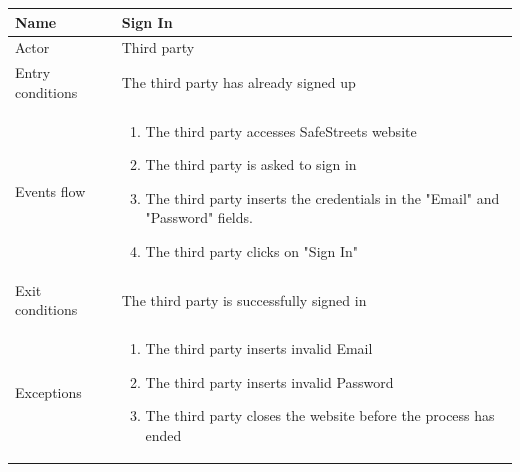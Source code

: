 \documentclass{article}
\begin{document}
\begin{table}[H]
    \begin{tabular}{|l|l|}
    \hline
    Name & \begin{minipage}[t]{0.7\textwidth}\textbf{Sign In} \end{minipage} \\ \hline  
    Actor & \begin{minipage}[t]{0.7\textwidth} Third party \end{minipage} \\ \hline 
    Entry conditions & \begin{minipage}[t]{0.7\textwidth} The third party has already signed up\end{minipage} \\
    \hline 
    Events flow & \begin{minipage}[t]{0.7\textwidth}
    \begin{enumerate}
        \item The third party accesses SafeStreets website
        \item The third party is asked to sign in
        \item The third party inserts the credentials in the "Email" and
        "Password" fields.
        \item The third party clicks on "Sign In"
    \end{enumerate}    
    \end{minipage} \\ \hline
    Exit conditions & \begin{minipage}[t]{0.7\textwidth} The third party is successfully signed in \end{minipage} \\
    \hline
    Exceptions & \begin{minipage}[t]{0.7\textwidth}
    \begin{enumerate}
        \item The third party inserts invalid Email
        \item The third party inserts invalid Password
        \item The third party closes the website before the process has ended
    \end{enumerate}
    \end{minipage} \\ \hline
    \end{tabular}
\end{table}
\end{document}
